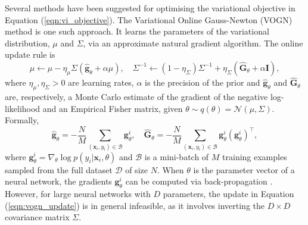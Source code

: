 \documentclass[msc,deptreport.inf]{infthesis} %
\newcommand{\matr}[1]{\mathbf{#1}}
\begin{document}
Several methods have been suggested for optimising the variational objective in Equation (\ref{eqn:vi_objective}). The Variational Online Gauss-Newton (VOGN) method \cite{tangkaratt2018} is one such approach. It learns the parameters of the variational distribution, $\mu$ and $\Sigma$, via an approximate natural gradient algorithm. The online update rule is
\begin{equation}\label{eqn:vogn_update}
	\mu \leftarrow \mu - \eta_\mu \Sigma (\hat{\matr{g}}_\theta + \alpha \mu), \quad 
	\Sigma^{-1} \leftarrow (1 - \eta_\Sigma) \Sigma^{-1} + \eta_\Sigma(\hat{\matr{G}}_\theta + \alpha \matr{I}),
\end{equation}
where $\eta_\mu, \eta_\Sigma > 0$ are learning rates, $\alpha$ is the precision of the prior and $\hat{\matr{g}}_\theta$ and $\hat{\matr{G}}_\theta$ are, respectively, a Monte Carlo estimate of the gradient of the negative log-likelihood and an Empirical Fisher matrix, given $\theta \sim q(\theta) = \mathcal{N}(\mu, \Sigma)$. Formally, 
\begin{equation}\label{eqn:slang_g_and_G}
	\hat{\matr{g}}_\theta = -\frac{N}{M} \sum_{(\matr{x}_i, y_i) \in \mathcal{B}} \matr{g}_\theta^i, \quad
	\hat{\matr{G}}_\theta = -\frac{N}{M} \sum_{(\matr{x}_i, y_i) \in \mathcal{B}} \matr{g}_\theta^i (\matr{g}_\theta^i)^\intercal,
\end{equation}
where $\matr{g}_\theta^i = \nabla_\theta \log p(y_i | \matr{x}_i, \theta)$ and $\mathcal{B}$ is a mini-batch of $M$ training examples sampled from the full dataset $\mathcal{D}$ of size $N$. When $\theta$ is the parameter vector of a neural network, the gradients $\matr{g}_\theta^i$ can be computed via back-propagation \cite{rumelhart1986}. However, for large neural networks with $D$ parameters, the update in Equation (\ref{eqn:vogn_update}) is in general infeasible, as it involves inverting the $D \times D$ covariance matrix $\Sigma$.
\end{document}
